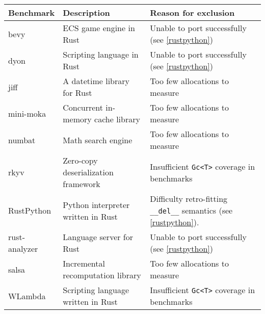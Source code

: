 \begin{tabular}{lll}
\toprule
Benchmark         & Description                              & Reason for exclusion                                       \\
\midrule
bevy          & ECS game engine in Rust                   & Unable to port successfully (see \cref{rustpython}) \\
dyon          & Scripting language in Rust                & Unable to port successfully (see \cref{rustpython})\\
jiff          & A datetime library for Rust               & Too few allocations to measure \\
mini-moka     & Concurrent in-memory cache library        & Too few allocations to measure \\
numbat        & Math search engine                        & Too few allocations to measure \\
rkyv          & Zero-copy deserialization framework       & Insufficient \texttt{Gc<T>} coverage in benchmarks \\
RustPython    & Python interpreter written in Rust        & Difficulty retro-fitting \texttt{\_\_del\_\_} semantics (see \cref{rustpython}). \\
rust-analyzer & Language server for Rust                  & Unable to port successfully (see \cref{rustpython}) \\
salsa         & Incremental recomputation library         & Too few allocations to measure \\
WLambda       & Scripting language written in Rust        & Insufficient \texttt{Gc<T>} coverage in benchmarks \\
\bottomrule
\end{tabular}
